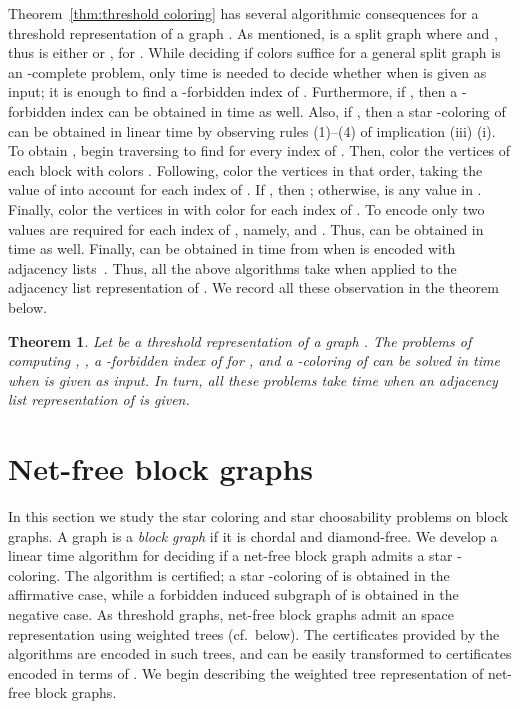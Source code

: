 \documentclass[a4paper, 11pt, oneside]{article}
\newtheorem{theorem}{Theorem}
\let\Definition=\emph
\begin{document}
Theorem~\ref{thm:threshold coloring} has several algorithmic consequences for a threshold representation  of a graph .  As mentioned,  is a split graph where  and , thus  is either  or , for .  While deciding if  colors suffice for a general split graph is an {\NP}-complete problem, only  time is needed to decide whether  when  is given as input; it is enough to find a -forbidden index of .  Furthermore, if , then a -forbidden index can be obtained in  time as well.  Also, if , then a star -coloring  of  can be obtained in linear time by observing rules (1)--(4) of implication (iii)  (i).  To obtain , begin traversing  to find  for every index  of .  Then, color the vertices of each block  with colors .  Following, color the vertices  in that order, taking the value of  into account for each index  of .  If , then ; otherwise,  is any value in .  Finally, color the vertices in  with color  for each index  of .  To encode  only two values are required for each index  of , namely,  and .  Thus,  can be obtained in  time as well.  Finally,  can be obtained in  time from  when  is encoded with adjacency lists~\cite{Golumbic2004,MahadevPeled1995}.  Thus, all the above algorithms take  when applied to the adjacency list representation of .  We record all these observation in the theorem below.

\begin{theorem}
  Let  be a threshold representation of a graph .  The problems of computing , , a -forbidden index of  for , and a -coloring of  can be solved in  time when  is given as input.  In turn, all these problems take  time when an adjacency list representation of  is given.
\end{theorem}



\section{Net-free block graphs}
\label{sec:block}

In this section we study the star coloring and star choosability problems on block graphs.  A graph is a \Definition{block graph} if it is chordal and diamond-free.  We develop a linear time algorithm for deciding if a net-free block graph  admits a star -coloring.  The algorithm is certified; a star -coloring of  is obtained in the affirmative case, while a forbidden induced subgraph of  is obtained in the negative case.  As threshold graphs, net-free block graphs admit an  space representation using weighted trees (cf.\ below).  The certificates provided by the algorithms are encoded in such trees, and can be easily transformed to certificates encoded in terms of .  We begin describing the weighted tree representation of net-free block graphs.
\end{document}
